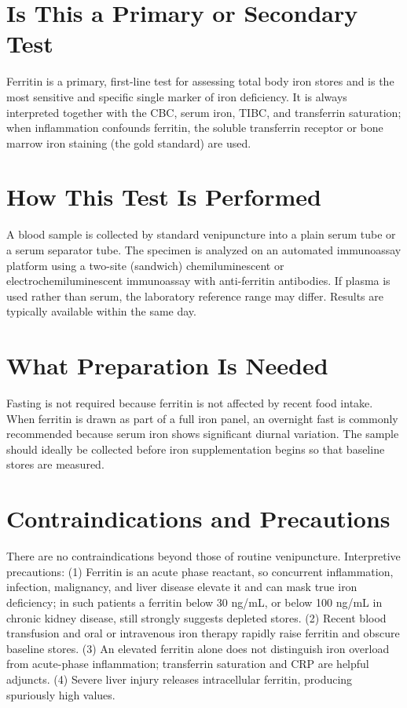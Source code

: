 \section*{Is This a Primary or Secondary Test}
Ferritin is a primary, first-line test for assessing total body iron stores and is the most sensitive and specific single marker of iron deficiency. It is always interpreted together with the CBC, serum iron, TIBC, and transferrin saturation; when inflammation confounds ferritin, the soluble transferrin receptor or bone marrow iron staining (the gold standard) are used.
\section*{How This Test Is Performed}
A blood sample is collected by standard venipuncture into a plain serum tube or a serum separator tube. The specimen is analyzed on an automated immunoassay platform using a two-site (sandwich) chemiluminescent or electrochemiluminescent immunoassay with anti-ferritin antibodies. If plasma is used rather than serum, the laboratory reference range may differ. Results are typically available within the same day.
\section*{What Preparation Is Needed}
Fasting is not required because ferritin is not affected by recent food intake. When ferritin is drawn as part of a full iron panel, an overnight fast is commonly recommended because serum iron shows significant diurnal variation. The sample should ideally be collected before iron supplementation begins so that baseline stores are measured.
\section*{Contraindications and Precautions}
There are no contraindications beyond those of routine venipuncture. Interpretive precautions: (1) Ferritin is an acute phase reactant, so concurrent inflammation, infection, malignancy, and liver disease elevate it and can mask true iron deficiency; in such patients a ferritin below 30 ng/mL, or below 100 ng/mL in chronic kidney disease, still strongly suggests depleted stores. (2) Recent blood transfusion and oral or intravenous iron therapy rapidly raise ferritin and obscure baseline stores. (3) An elevated ferritin alone does not distinguish iron overload from acute-phase inflammation; transferrin saturation and CRP are helpful adjuncts. (4) Severe liver injury releases intracellular ferritin, producing spuriously high values.
